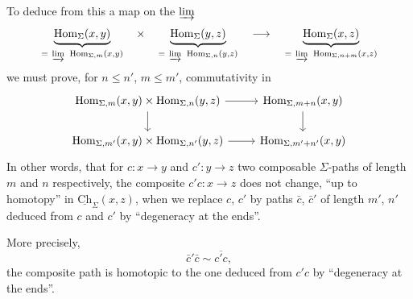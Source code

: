 \documentclass[11pt]{article}
\newcommand{\msp}[1]{\marginpar{\footnotesize [#1]}}
\newcommand{\uCh}{\underline{\mathrm{Ch}}}
\newcommand{\Hom}{\mathrm{Hom}}
\begin{document}
\msp{page 10}
To deduce from this a map on the $\varinjlim$
\[
\underbrace{\Hom_\Sigma(x,y)}_{=\ \varinjlim\ \Hom_{\Sigma,m}(x,y)}\quad\times\quad\underbrace{\Hom_\Sigma(y,z)}_{=\ \varinjlim\ \Hom_{\Sigma,n}(y,z)}\quad\longrightarrow\quad\underbrace{\Hom_\Sigma(x,z)}_{=\ \varinjlim\ \Hom_{\Sigma,n+m}(x,z)}
\]
we must prove, for $n\leq n'$, $m\leq m'$, commutativity in
\[
\begin{tikzcd}
\Hom_{\Sigma,m}(x,y)\times\Hom_{\Sigma,n}(y,z) \arrow[r] \arrow[d] & \Hom_{\Sigma,m+n}(x,y) \arrow[d] \\
\Hom_{\Sigma,m'}(x,y)\times\Hom_{\Sigma,n'}(y,z) \arrow[r] & \Hom_{\Sigma,m'+n'}(x,y)
\end{tikzcd}
\]
 In other words, that for $c:x\longrightarrow y$ and $c':y\longrightarrow z$ two composable $\Sigma$-paths of length $m$ and $n$ respectively, the composite $c'c:x\longrightarrow z$ does not change, ``up to homotopy'' in $\uCh_\Sigma(x,z)$, when we replace $c$, $c'$ by paths $\bar{c}$, $\bar{c}'$ of length $m'$, $n'$ deduced from $c$ and $c'$ by ``degeneracy at the ends''.

More precisely, %
\[
\bar{c}'\bar{c}\sim\overline{c'c},
\]
the composite path is homotopic to the one deduced from $c'c$ by ``degeneracy at the ends''.
\end{document}
